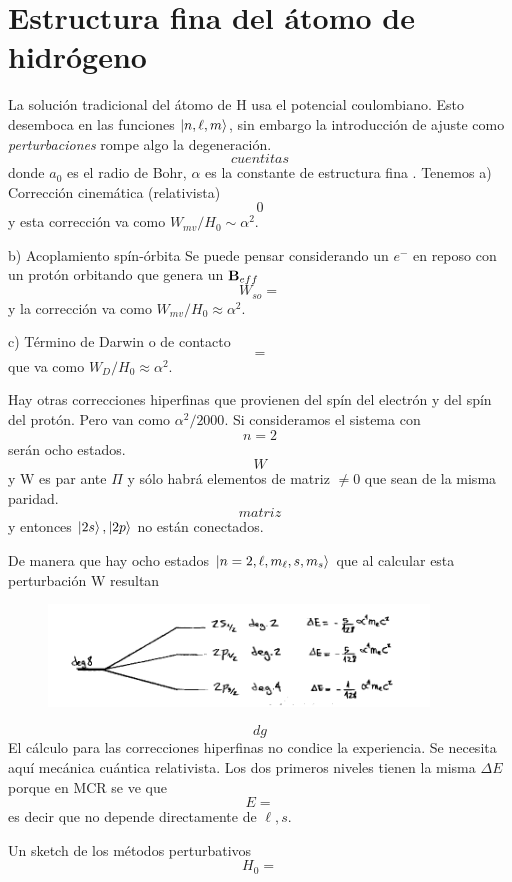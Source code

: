 \documentclass[10pt,oneside]{CBFT_book}
\begin{document}
\section{Estructura fina del átomo de hidrógeno}

La solución tradicional del átomo de H usa el potencial coulombiano. Esto desemboca en las funciones 
$\Ket{n,\ell,m}$, sin embargo la introducción de ajuste como {\it perturbaciones} rompe algo la degeneración.
\[
	cuentitas
\]
donde $a_0$ es el radio de Bohr, $\alpha$ es la constante de estructura fina .
Tenemos 
a) Corrección cinemática (relativista)
\[	
	0
\]
y esta corrección va como $W_{mv}/H_0 \sim \alpha^2$.

b) Acoplamiento spín-órbita
Se puede pensar considerando un $e^-$ en reposo con un protón orbitando que genera un $\vb{B}_{eff}$
\[
	W_{so} =
\]
y la corrección va como $W_{mv}/H_0 \approx \alpha^2$.

c) Término de Darwin o de contacto
\[
	=
\]
que va como  $W_{D}/H_0 \approx \alpha^2$.

Hay otras correcciones hiperfinas que provienen del spín del electrón y del spín del protón. Pero van como 
$\alpha^2/2000$.
Si consideramos el sistema con 
\[
	n=2
\]
serán ocho estados.
\[
	W
\]
y W es par ante $\Pi$ y sólo habrá elementos de matriz $\neq 0$ que sean de la misma paridad.
\[
	matriz
\]
y entonces $\Ket{2s}, \Ket{2p}$ no están conectados.

De manera que hay ocho estados $\Ket{n=2,\ell,m_\ell,s,m_s}$ que al calcular esta perturbación W resultan 
\begin{figure}[htb]
	\begin{center}
	\includegraphics[width=0.9\textwidth]{images/teo2_21.pdf}
	\end{center}
	\caption{}
\end{figure} 
\[
	dg
\]
El cálculo para las correcciones hiperfinas no condice la experiencia. Se necesita aquí mecánica cuántica 
relativista. Los dos primeros niveles tienen la misma $\Delta E$ porque en MCR se ve que 
\[
	E = 
\]
es decir que no depende directamente de $\ell,s$.

Un sketch de los métodos perturbativos
\[
	H_0 = 
\]



\end{document}
